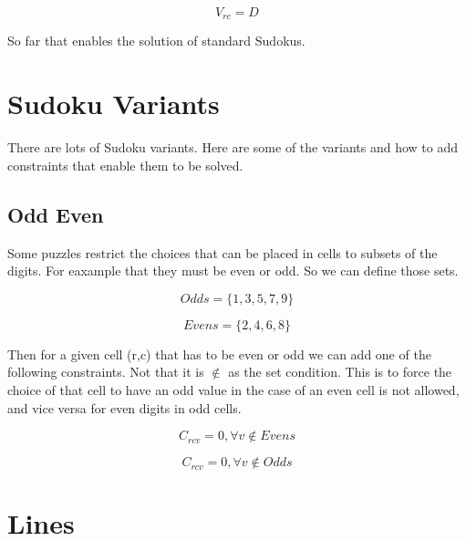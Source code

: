 \documentclass{article}
\begin{document}
\begin{equation}
V_{rc} = D
\end{equation}

So far that enables the solution of standard Sudokus. 


\section{Sudoku Variants}

There are lots of Sudoku variants. Here are some of the variants and how to add constraints that enable them to be solved. 

\subsection{Odd Even}

Some puzzles restrict the choices that can be placed in cells to subsets of the digits.  For eaxample that they must be even or odd. So we can define those sets.

\begin{equation}
Odds=\lbrace1,3,5,7,9 \rbrace
\end{equation}

\begin{equation}
Evens=\lbrace2,4,6,8 \rbrace
\end{equation}

Then for a given cell (r,c) that has to be even or odd we can add one of the following constraints. Not that it is \( \notin \) as the set condition.  This is to force the choice
of that cell to have an odd value in the case of an even cell is not allowed, and vice versa for even digits in odd cells.

\begin{equation}
C_{rcv} = 0, \forall v \notin Evens
\end{equation}

\begin{equation}
C_{rcv} = 0, \forall v \notin Odds
\end{equation}


\section{Lines}
\end{document}
